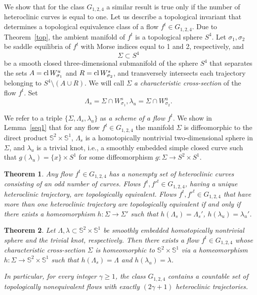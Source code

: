 \documentclass[%
 aip,
 amsmath,amssymb,
preprint,%
]{revtex4-1}
\newtheorem{theorem}{Theorem}
\begin{document}
We show that for the class $G_{1,2,4}$ a similar result is true only if the number of heteroclinic curves  is equal to   one. Let us describe a topological invariant that determines a topological equivalence class of  a flow  $f^t\in G_{1,2,4}$. Due to Theorem~\ref{top}, the ambient manifold of $f^t$ is a topological sphere $S^4$.  Let $\sigma_1, \sigma_2$ be saddle equilibria of $f^t$ with Morse indices equal to 1 and 2, respectively, and $$\Sigma\subset S^4$$ be a smooth closed three-dimensional submanifold of the sphere $S^4$ that separates the sets $A={\rm cl}\,W^u_{\sigma_1}$ and $R={\rm cl}\,W^s_{\sigma_2}$,  and transversely intersects each trajectory belonging to  $S^4\setminus (A\cup R)$. We will call $\Sigma$ {\it a characteristic cross-section} of the flow $f^t$. Set $$\Lambda_s=\Sigma\cap W^s_{\sigma_1}, \lambda_u=\Sigma\cap W^u_{\sigma_2}.$$ 

We refer to  a  triple $\{\Sigma, \Lambda_s, \lambda_u\}$  as  {\it a scheme of a flow $f^t$}. We show in Lemma~\ref{seq1} that for any flow $f^t\in G_{1,2,4}$ the manifold $\Sigma$ is diffeomorphic to the direct product $\mathbb S^2\times \mathbb S^1$, $\Lambda_s$ is a homotopically  nontrivial two-dimensional sphere in $\Sigma$, and $\lambda_u$ is a trivial knot, i.e., a smoothly embedded simple closed curve such that $g(\lambda_u)=\{x\}\times S^1$ for some diffeomorphism $g: \Sigma\to S^2\times S^1$. 

\begin{theorem}\label{clas} Any flow $f^t\in G_{1,2,4}$ has a nonempty set of heteroclinic curves consisting of an odd number of curves. Flows $f^t, {f'}^t\in G_{1,2,4}$, having a unique heteroclinic trajectory, are topologically equivalent. Flows $f^t, {f'}^t\in G_{1,2,4}$ that have more than one heteroclinic trajectory are topologically equivalent if and only if there exists a homeomorphism $h: \Sigma\to \Sigma'$ such that $h(\Lambda_s)=\Lambda_s'$, $h(\lambda_u)=\lambda_u'$.
\end{theorem}


\begin{theorem}\label{realiz} Let $\Lambda, \lambda \subset \mathbb S^2\times \mathbb S^1$ be  smoothly embedded homotopically nontrivial sphere and the trivial knot, respectively. Then there exists a flow $f^t\in G_{1,2,4}$ whose characteristic  cross-section $\Sigma$ is homeomorphic to $\mathbb S^2\times \mathbb S^1$ via a homeomorphism $h:\Sigma\to \mathbb S^2\times \mathbb S^1$ such that $h(\Lambda_s)=\Lambda$ and $h(\lambda_u)=\lambda$.

In particular, for every integer $\gamma \geq 1$, the class $G_{1,2,4}$ contains a countable set of topologically nonequivalent flows with exactly $(2\gamma+1)$ heteroclinic trajectories.
\end{theorem}
\end{document}
